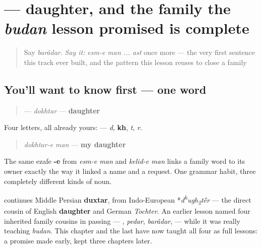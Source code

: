 \section[\texorpdfstring{\fa{دختر} (dokhtar)}{دختر (dokhtar)}]{ — daughter, and the family the \emph{budan} lesson promised is complete}

\label{lesson:FA-C10-dokhtar}



\begin{quote}
Say \emph{barâdar}. \emph{Say it:} \emph{esm-e man ... ast} once more — the very first sentence this track ever built, and the pattern this lesson reuses to close a family
\end{quote}

\subsection*{You'll want to know first — one word}
\begin{quote}
\textbf{} — \emph{dokhtar} — \textbf{daughter}
\end{quote}

Four letters, all already yours: \textbf{   } — \emph{d}, \textbf{kh}, \emph{t}, \emph{r}.

\begin{grammarlens}[title={Grammar Lens: naming a family member as your own}]
\begin{quote}
\emph{dokhtar-e man} — \textbf{my daughter}
\end{quote}

The same ezafe \textbf{-e} from \emph{esm-e man} and \emph{kelid-e man} links a family word to its owner exactly the way it linked a name and a request. One grammar habit, three completely different kinds of noun.
\end{grammarlens}

\begin{cousinweb}
\textbf{} continues Middle Persian \textbf{duxtar}, from Indo-European *\emph{d\textsuperscript{h}ugh\textsubscript{2}t\'{\={e}}r} — the direct cousin of English \textbf{daughter} and German \emph{Tochter}. An earlier lesson named four inherited family cousins in passing — \textbf{}, \emph{pedar}, \emph{barâdar}, \textbf{} — while it was really teaching \emph{budan}. This chapter and the last have now taught all four as full lessons: a promise made early, kept three chapters later.
\end{cousinweb}

